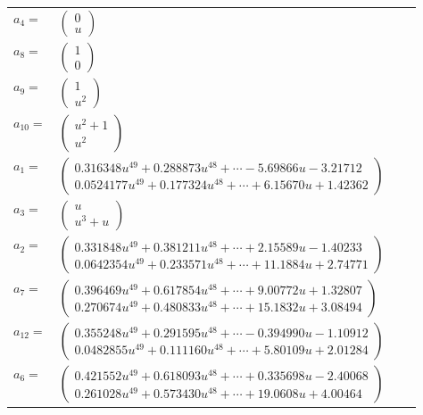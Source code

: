 \documentclass[1p]{elsarticle_modified}
\theoremstyle{definition}
\begin{document}
\begin{tabular}{m{7pt} m{180pt} m{7pt} m{180pt} }
\flushright $a_{4}=$&$\begin{pmatrix}0\\u\end{pmatrix}$ \\
\flushright $a_{8}=$&$\begin{pmatrix}1\\0\end{pmatrix}$ \\
\flushright $a_{9}=$&$\begin{pmatrix}1\\u^2\end{pmatrix}$ \\
\flushright $a_{10}=$&$\begin{pmatrix}u^2+1\\u^2\end{pmatrix}$ \\
\flushright $a_{1}=$&$\begin{pmatrix}0.316348 u^{49}+0.288873 u^{48}+\cdots-5.69866 u-3.21712\\0.0524177 u^{49}+0.177324 u^{48}+\cdots+6.15670 u+1.42362\end{pmatrix}$ \\
\flushright $a_{3}=$&$\begin{pmatrix}u\\u^3+u\end{pmatrix}$ \\
\flushright $a_{2}=$&$\begin{pmatrix}0.331848 u^{49}+0.381211 u^{48}+\cdots+2.15589 u-1.40233\\0.0642354 u^{49}+0.233571 u^{48}+\cdots+11.1884 u+2.74771\end{pmatrix}$ \\
\flushright $a_{7}=$&$\begin{pmatrix}0.396469 u^{49}+0.617854 u^{48}+\cdots+9.00772 u+1.32807\\0.270674 u^{49}+0.480833 u^{48}+\cdots+15.1832 u+3.08494\end{pmatrix}$ \\
\flushright $a_{12}=$&$\begin{pmatrix}0.355248 u^{49}+0.291595 u^{48}+\cdots-0.394990 u-1.10912\\0.0482855 u^{49}+0.111160 u^{48}+\cdots+5.80109 u+2.01284\end{pmatrix}$ \\
\flushright $a_{6}=$&$\begin{pmatrix}0.421552 u^{49}+0.618093 u^{48}+\cdots+0.335698 u-2.40068\\0.261028 u^{49}+0.573430 u^{48}+\cdots+19.0608 u+4.00464\end{pmatrix}$ \\

\end{tabular}
\end{document}

